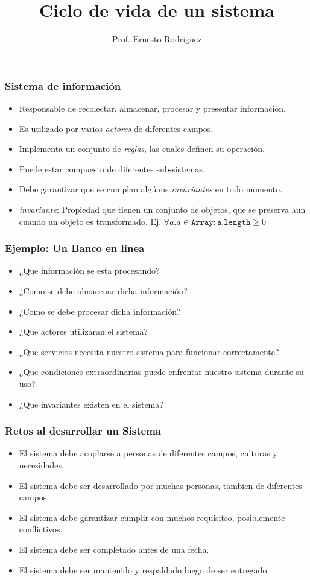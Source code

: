 \documentclass{beamer}
\title[Ciclo de vida]{Ciclo de vida de un sistema}
\author{Prof. Ernesto Rodriguez}
\institute{
    Universidad del Itsmo \\
    \medskip \textit{erodriguez@unis.edu.gt}
}
\date[\today]{}
\begin{document}
\begin{frame}
\titlepage
\end{frame}

\begin{frame}
    \frametitle{Sistema de informaci\'on}
    \begin{itemize}
        \item{Responsable de recolectar, almacenar, procesar y presentar informaci\'on.}
        \item{Es utilizado por varios \emph{actores} de diferentes campos.}
        \item{Implementa un conjunto de \emph{reglas}, las cuales definen su operaci\'on.}
        \item{Puede estar compuesto de diferentes sub-sistemas.}
        \item{Debe garantizar que se cumplan alg\'uans \emph{invariantes} en todo momento.}
        \item{\emph{invariante}: Propiedad que tienen un conjunto de objetos, que se preserva aun cuando un objeto es transformado. Ej. $\forall a . a \in \mathtt{Array}:\mathtt{a.length} \geq 0$ }
    \end{itemize}

\end{frame}

\begin{frame}
    \frametitle{Ejemplo: Un Banco en linea}
    \begin{itemize}
        \item{¿Que información se esta procesando?}
        \item{¿Como se debe almacenar dicha informaci\'on?}
        \item{¿Como se debe procesar dicha informaci\'on?}
        \item{¿Que actores utilizaran el sistema?}
        \item{¿Que servicios necesita nuestro sistema para funcionar correctamente?}
        \item{¿Que condiciones extraordinarias puede enfrentar nuestro sistema durante su uso?}
        \item{¿Que invariantes existen en el sistema?}
    \end{itemize}
\end{frame}

\begin{frame}
    \frametitle{Retos al desarrollar un Sistema}
    \begin{itemize}
        \item{El sistema debe acoplarse a personas de diferentes campos, culturas y necesidades.}
        \item{El sistema debe ser desarrollado por muchas personas, tambien de diferentes campos.}
        \item{El sistema debe garantizar cumplir con muchos requisitso, posiblemente conflictivos.}
        \item{El sistema debe ser completado antes de una fecha.}
        \item{El sistema debe ser mantenido y respaldado luego de ser entregado.}
    \end{itemize}
\end{frame}
\end{document}
